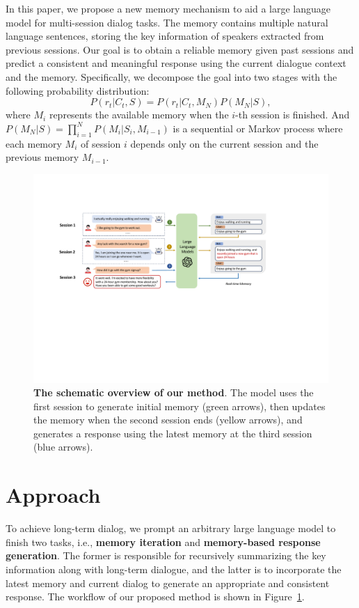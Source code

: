 \documentclass[authoryear,preprint,review,12pt]{elsarticle}
\begin{document}
In this paper, we propose a new memory mechanism to aid a large language model for multi-session dialog tasks. The memory contains multiple natural language sentences, storing the key information of speakers extracted from previous sessions. Our goal is to obtain a reliable memory given past sessions and predict a consistent and meaningful response using the current dialogue context and the memory. Specifically, we decompose the goal into two stages with the following probability distribution:
\begin{equation}
    P(r_t|C_t,S) = P(r_t|C_t,M_N)P(M_N|S),
\end{equation}
where $M_i$ represents the available memory when the $i$-th session is finished. And $P(M_N|S)=\prod_{i=1}^{N}P(M_i|S_i,M_{i-1})$ is a sequential or Markov process where each memory $M_i$ of session $i$ depends only on the current session and the previous memory $M_{i-1}$.


\begin{figure}[t]
  \centering
  \includegraphics[scale=0.65]{model.pdf}
  \caption{\textbf{The schematic overview of our method}. The model uses the first session to generate initial memory (green arrows), then updates the memory when the second session ends (yellow arrows), and generates a response using the latest memory at the third session (blue arrows).}
  \label{fig:model}
\end{figure}
\section{Approach}
To achieve long-term dialog, we prompt an arbitrary large language model to finish two tasks, i.e., \textbf{memory iteration} and \textbf{memory-based response generation}. The former is responsible for recursively summarizing the key information along with long-term dialogue, and the latter is to incorporate the latest memory and current dialog to generate an appropriate and consistent response. The workflow of our proposed method is shown in Figure~\ref{fig:model}. 
\end{document}
